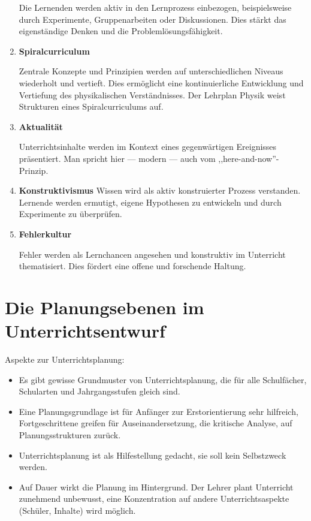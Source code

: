 \begin{enumerate}
	Die Lernenden werden aktiv in den Lernprozess einbezogen, beispielsweise durch Experimente, Gruppenarbeiten oder Diskussionen. Dies st\"{a}rkt das eigenst\"{a}ndige Denken und die Probleml\"{o}sungsf\"{a}higkeit.
	
	\item{\textbf{Spiralcurriculum}}
	
	Zentrale Konzepte und Prinzipien werden auf unterschiedlichen Niveaus wiederholt und vertieft. Dies erm\"{o}glicht eine kontinuierliche Entwicklung und Vertiefung des physikalischen Verst\"{a}ndnisses. Der Lehrplan Physik weist Strukturen eines Spiralcurriculums auf.
	
	\item{\textbf{Aktualit\"{a}t}}
	
	Unterrichtsinhalte werden im Kontext eines gegenw\"{a}rtigen
	Ereignisses pr\"{a}sentiert.
	\mip
	Man spricht hier --- modern --- auch vom ,,here-and-now''-Prinzip.
	
	\item{\textbf{Konstruktivismus}}
	Wissen wird als aktiv konstruierter Prozess verstanden. Lernende werden ermutigt, eigene Hypothesen zu entwickeln und durch Experimente zu \"{u}berpr\"{u}fen.
	
	\item{\textbf{Fehlerkultur}}
	
	Fehler werden als Lernchancen angesehen und konstruktiv im Unterricht thematisiert. Dies f\"{o}rdert eine offene und forschende Haltung.
	
\end{enumerate}

\bip\bip
\section{Die Planungsebenen im Unterrichtsentwurf}

Aspekte zur Unterrichtsplanung:
\begin{itemize}
	\item
	Es gibt gewisse Grundmuster von Unterrichtsplanung, die f\"{u}r alle
	Schulf\"{a}cher, Schularten und Jahrgangsstufen gleich sind.
	\item
	Eine Planungsgrundlage ist f\"{u}r Anf\"{a}nger zur
	Erstorientierung sehr hilfreich,
	Fortgeschrittene greifen f\"{u}r Auseinandersetzung, die kritische
	Analyse, auf Planungsstrukturen zur\"{u}ck.
	\item
	Unterrichtsplanung ist als Hilfestellung gedacht, sie soll kein
	Selbstzweck werden.
	\item
	Auf Dauer wirkt die Planung im Hintergrund.
	Der Lehrer plant Unterricht zunehmend unbewusst, eine Konzentration
	auf andere Unterrichtsaspekte (Sch\"{u}ler, Inhalte) wird m\"{o}glich.
\end{itemize}


